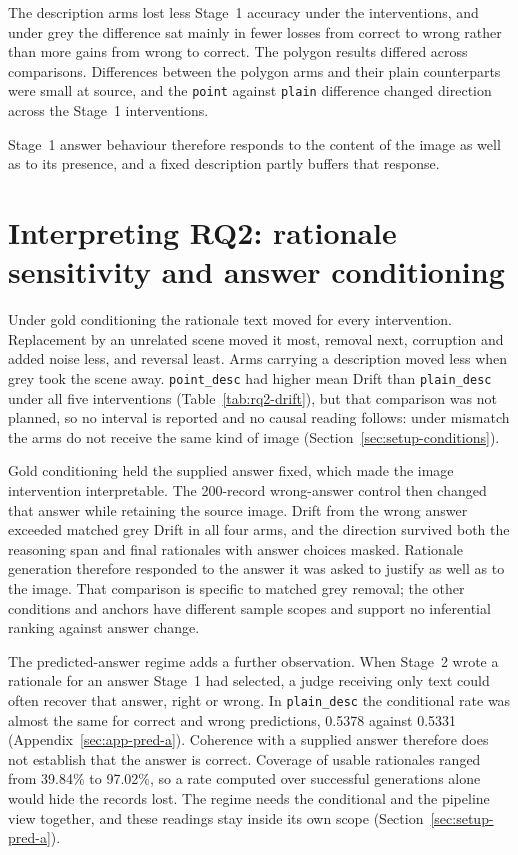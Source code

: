 The description arms lost less Stage~1 accuracy under the interventions, and
under grey the difference sat mainly in fewer losses from correct to wrong rather than
more gains from wrong to correct.
The polygon results differed across comparisons. Differences between the polygon
arms and their plain counterparts were small at source, and the \texttt{point}
against \texttt{plain} difference changed direction across the Stage~1
interventions.

Stage~1 answer behaviour therefore responds to the content of the image as well
as to its presence, and a fixed description partly buffers that response.

\section[Interpreting RQ2: rationale sensitivity and answer conditioning]%
  {Interpreting RQ2: rationale sensitivity and \mbox{answer} conditioning}
\label{sec:discussion-rq2}

Under gold conditioning the rationale text moved for every intervention.
Replacement by an unrelated scene moved it most, removal next, corruption and
added noise less, and reversal least. Arms carrying a description moved less when grey took the
scene away. \texttt{point\_desc} had higher mean Drift than
\texttt{plain\_desc} under all five interventions
(Table~\ref{tab:rq2-drift}), but that comparison was not
planned, so no interval is reported and no causal reading follows: under
mismatch the arms do not receive the same kind of image
(Section~\ref{sec:setup-conditions}).

Gold conditioning held the supplied answer fixed, which made the image
intervention interpretable. The 200-record wrong-answer control then changed
that answer while retaining the source image. Drift from the wrong answer
exceeded matched grey Drift in all four arms, and the direction survived both
the reasoning span and final rationales with answer choices masked. Rationale
generation therefore responded to the answer it was asked to justify as well as
to the image. That comparison is specific to matched grey removal; the other
conditions and anchors have different sample scopes and support no inferential
ranking against answer change.

The predicted-answer regime adds a further observation. When Stage~2
wrote a rationale for an answer Stage~1 had selected, a judge receiving only
text could often recover that answer, right or wrong. In \texttt{plain\_desc}
the conditional rate was almost the same for correct and wrong predictions,
0.5378 against 0.5331 (Appendix~\ref{sec:app-pred-a}). Coherence with a supplied
answer therefore does not establish that the answer is correct. Coverage of usable
rationales ranged from 39.84\% to 97.02\%, so a rate computed over successful
generations alone would hide the records lost. The regime needs the
conditional and the pipeline view together, and these readings stay inside its
own scope (Section~\ref{sec:setup-pred-a}).

